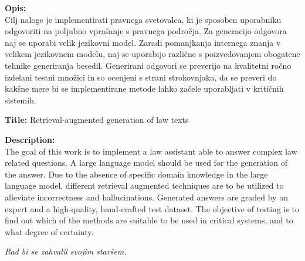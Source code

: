 \documentclass[a4paper,12pt,openright]{book}
\newcommand{\ttitleEn}{Retrieval-augmented generation of law texts}
\newcommand{\clearemptydoublepage}{\newpage{\pagestyle{empty}\cleardoublepage}}
\begin{document}
\bigskip
\noindent\textbf{Opis:}\\
Cilj naloge je implementirati pravnega svetovalca, ki je sposoben uporabniku odgovoriti na poljubno vprašanje s pravnega področja. Za generacijo odgovora naj se uporabi velik jezikovni model. Zaradi pomanjkanja internega znanja v velikem jezikovnem modelu, naj se uporabijo različne s poizvedovanjem obogatene tehnike generiranja besedil. Generirani odgovori se preverijo na kvalitetni ročno izdelani testni množici in so ocenjeni s strani strokovnjaka, da se preveri do kakšne mere bi se implementirane metode lahko začele uporabljati v kritičnih sistemih.

\bigskip
\noindent\textbf{Title:} \ttitleEn

\bigskip
\noindent\textbf{Description:}\\
The goal of this work is to implement a law assistant able to answer complex law related questions. A large language model should be used for the generation of the answer. Due to the absence of specific domain knowledge in the large language model, different retrieval augmented techniques are to be utilized to alleviate incorrectness and hallucinations. Generated answers are graded by an expert and a high-quality, hand-crafted test dataset. The objective of testing is to find out which of the methods are suitable to be used in critical systems, and to what degree of certainty.

\vfill



\vspace{2cm}

\clearemptydoublepage

\thispagestyle{empty}\mbox{}\vfill\null\it%
\noindent
Rad bi se zahvalil svojim staršem.
\rm\normalfont

\clearemptydoublepage




\pagestyle{empty}
\def\thepage{}%
\tableofcontents{}


\clearemptydoublepage
\end{document}
